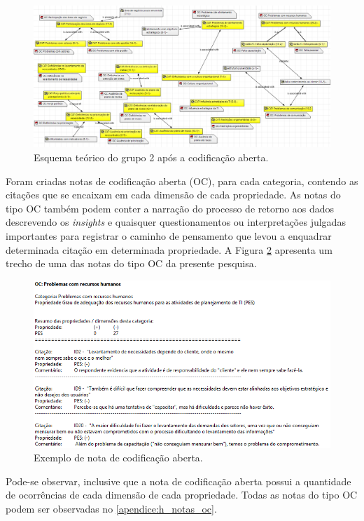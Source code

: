 \begin{figure}[h]
\centering %
\includegraphics[width=16cm, frame]{figuras/oc_grupo2.PNG}
\caption{Esquema teórico do grupo 2 após a codificação aberta.}
\label{figura:oc_grupo2}
\end{figure}
	
Foram criadas notas de codificação aberta (OC), para cada categoria, contendo as citações que se encaixam em cada dimensão de cada propriedade. As notas do tipo OC também podem conter a narração do processo de retorno aos dados descrevendo os \textit{insights} e quaisquer questionamentos ou interpretações julgadas importantes para registrar o caminho de pensamento que levou a enquadrar determinada citação em determinada propriedade. A Figura \ref{figura:oc_memo} apresenta um trecho de uma das notas do tipo OC da presente pesquisa. 

\begin{figure}[h]
\centering %
\includegraphics[width=16cm, frame]{figuras/oc_memo.PNG}
\caption{Exemplo de nota de codificação aberta.}
\label{figura:oc_memo}
\end{figure}

Pode-se observar, inclusive que a nota de codificação aberta possui a quantidade de ocorrências de cada dimensão de cada propriedade. Todas as notas do tipo OC podem ser observadas no \autoref{apendice:h_notas_oc}.

